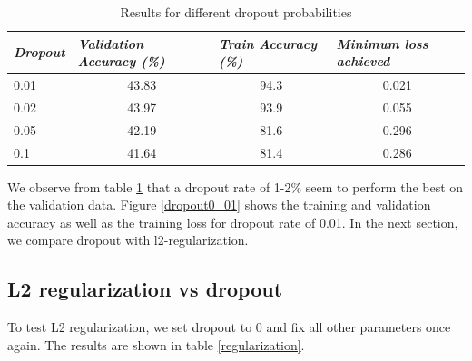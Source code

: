 \documentclass[12pt,twoside]{article}
\begin{document}
\begin{table}[!htbp]
\centering
\begin{tabular}{|l|c|c|c|}
\hline
\textit{\textbf{Dropout}} & \multicolumn{1}{l|}{\textit{\textbf{Validation Accuracy (\%)}}} & \multicolumn{1}{l|}{\textit{\textbf{Train Accuracy (\%)}}} & \multicolumn{1}{l|}{\textit{\textbf{Minimum loss achieved}}} \\ \hline
0.01                      & 43.83                                                           & 94.3                                                       & 0.021                                                        \\ \hline
0.02                      & 43.97                                                           & 93.9                                                       & 0.055                                                        \\ \hline
0.05                      & 42.19                                                           & 81.6                                                       & 0.296                                                        \\ \hline
0.1                       & 41.64                                                           & 81.4                                                       & 0.286                                                        \\ \hline
\end{tabular}
\caption{Results for different dropout probabilities}
\label{dropout}
\end{table}

We observe from table \ref{dropout} that a dropout rate of 1-2\% seem to perform the best on the validation data. Figure \ref{dropout0_01} shows the training and validation accuracy as well as the training loss for dropout rate of 0.01. In the next section, we compare dropout with l2-regularization.

\subsection{L2 regularization vs dropout}

To test L2 regularization, we set dropout to 0 and fix all other parameters once again. The results are shown in table \ref{regularization}.
\end{document}
